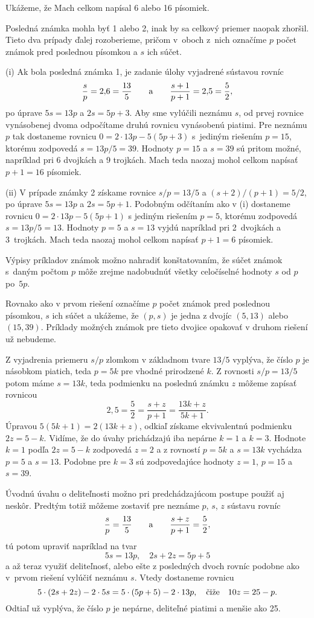 {%
Ukážeme, že Mach celkom napísal 6 alebo 16 písomiek.

Posledná známka mohla byť 1 alebo 2, inak by sa celkový priemer
naopak zhoršil. Tieto dva prípady ďalej rozoberieme, pričom
v~oboch z~nich označíme $p$ počet známok pred poslednou písomkou
a $s$ ich súčet.

(i) Ak bola posledná známka 1, je zadanie úlohy vyjadrené
sústavou rovníc
$$
\frac sp=2{,}6=\frac{13}5\qquad\hbox{a}\qquad \frac{s+1}{p+1}=2{,}5=\frac 52,
$$
po úprave $5s=13p$ a $2s=5p+3$. Aby sme vylúčili neznámu $s$,
od prvej rovnice vynásobenej dvoma odpočítame druhú rovnicu
vynásobenú piatimi. Pre neznámu $p$ tak dostaneme rovnicu
$0=2\cdot13p-5(5p+3)$ s~jediným riešením $p=15$,
ktorému zodpovedá $s=13p/5=39$. Hodnoty $p=15$ a $s=39$
sú pritom možné, napríklad pri 6 dvojkách a 9 trojkách.
Mach teda naozaj mohol celkom napísať $p+1=16$ písomiek.

(ii) V prípade známky 2 získame rovnice $s/p=13/5$ a
$(s+2)/(p+1)=5/2$, po úprave $5s=13p$ a $2s=5p+1$. Podobným
odčítaním ako v (i) dostaneme rovnicu $0=2\cdot13p-5(5p+1)$
s jediným riešením $p=5$, ktorému zodpovedá $s=13p/5=13$.
Hodnoty $p=5$ a $s=13$ vyjdú napríklad pri 2~dvojkách a
3~trojkách.
Mach teda naozaj mohol celkom napísať $p+1=6$ písomiek.

\poznamka
Výpisy príkladov známok možno nahradiť konštatovaním, že súčet
známok s~daným počtom $p$ môže zrejme nadobudnúť
všetky celočíselné hodnoty $s$ od $p$ po~$5p$.

\ineriesenie
Rovnako ako v prvom riešení označíme $p$ počet známok
pred poslednou písomkou, $s$ ich súčet a ukážeme, že
$(p,s)$ je jedna z dvojíc $(5,13)$ alebo $(15,39)$.
Príklady možných známok pre tieto dvojice opakovať v druhom riešení
už nebudeme.

Z vyjadrenia priemeru $s/p$ zlomkom v základnom tvare $13/5$ vyplýva,
že číslo $p$ je násobkom piatich, teda $p=5k$ pre vhodné prirodzené
$k$. Z rovnosti $s/p=13/5$ potom máme $s=13k$,
teda podmienku na poslednú známku $z$ môžeme zapísať rovnicou
$$
2{,}5=\frac52=\frac{s+z}{p+1}=\frac{13k+z}{5k+1}.
$$
Úpravou $5(5k+1)=2(13k+z)$, odkiaľ získame ekvivalentnú podmienku
$2z=5-k$. Vidíme, že do úvahy prichádzajú iba nepárne $k=1$ a
$k=3$. Hodnote $k=1$ podľa $2z=5-k$ zodpovedá $z=2$ a
z rovností $p=5k$ a $s=13k$ vychádza $p=5$ a $s=13$.
Podobne pre $k=3$ sú zodpovedajúce hodnoty $z=1$, $p=15$ a
$s=39$.

\poznamka
Úvodnú úvahu o deliteľnosti možno pri predchádzajúcom postupe použiť aj
neskôr. Predtým totiž môžeme zostaviť pre neznáme $p$, $s$, $z$
sústavu rovníc
$$
\frac sp=\frac{13}5\qquad\hbox{a}\qquad\frac{s+z}{p+1}=\frac52,
$$
tú potom upraviť napríklad na tvar
$$
5s = 13p, \quad 2s + 2z = 5p +5
$$
a až teraz využiť deliteľnosť, alebo ešte
z posledných dvoch rovníc podobne ako v~prvom riešení vylúčiť
neznámu $s$. Vtedy dostaneme rovnicu
$$
5\cdot(2s+2z)-2\cdot 5s=5\cdot(5p+5)-2\cdot13p, \quad\hbox{čiže}\quad
10z=25-p.
$$
Odtiaľ už vyplýva, že číslo $p$ je nepárne, deliteľné piatimi a menšie ako 25.


}
